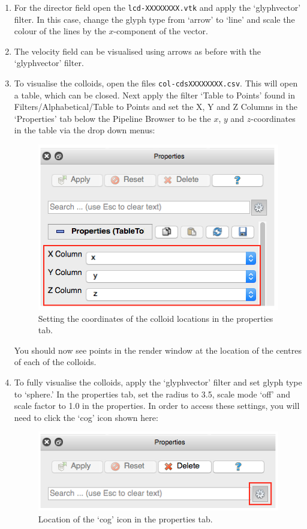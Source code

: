 \documentclass[11pt,twoside,a4paper]{article}
\begin{document}
\begin{enumerate}
\begin{enumerate}
\item For the director field open the \texttt{lcd-XXXXXXXX.vtk} and apply the `glyphvector' filter. In this case, change the glyph 
type from `arrow' to `line' and scale the colour of the lines by the $x$-component of the 
vector.
\item The velocity field can be visualised using arrows as before with the `glyphvector' filter.
\item To visualise the colloids, open the files \texttt{col-cdsXXXXXXXX.csv}. This will open 
a table, which can be closed. Next apply the filter `Table to Points' found in 
Filters/Alphabetical/Table to Points and set the X, Y and Z Columns in the `Properties' tab 
below the Pipeline Browser to be the $x$, $y$ and $z$-coordinates in the table via the 
drop down menus:

\begin{figure}[H]
\begin{center}
\includegraphics[width=0.5\linewidth]{colloidCoords.png}
  \caption{Setting the coordinates of the colloid locations in the properties tab.}
  \label{fig:collCoords}
  \end{center}
\end{figure}

 You should now see points in the render window at the location of the centres of each of the colloids.
\item To fully visualise the colloids, apply the `glyphvector' filter and set glyph type to 
`sphere.' In the properties tab, set the radius to 3.5, scale mode `off' and scale factor to 
1.0 in the properties. In order to access these settings, you will need to click the `cog' icon shown here:

\begin{figure}[H]
\begin{center}
\includegraphics[width=0.5\linewidth]{cog.png}
  \caption{Location of the `cog' icon in the properties tab.}
  \label{fig:cog}
  \end{center}
\end{figure}


\end{enumerate}
\end{enumerate}
\end{document}
